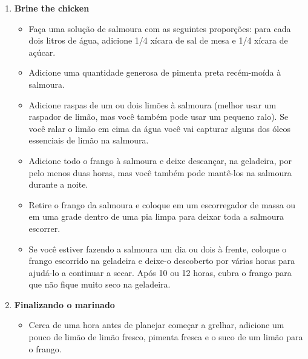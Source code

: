 \documentclass [11pt, letterpaper] {article}
\begin{document}
\begin {description}
\begin {enumerate}
\item {\bf Brine the chicken}
\begin {itemize}
\item Faça uma solução de salmoura com as seguintes proporções: para cada dois litros de água, adicione 1/4 xícara de sal de mesa e 1/4 xícara de açúcar.
\item Adicione uma quantidade generosa de pimenta preta recém-mo\'ida à salmoura.
\item Adicione raspas de um ou dois limões à salmoura (melhor usar um raspador de limão, mas você também pode usar um pequeno ralo). Se você ralar o lim\~ao em cima da água você vai capturar alguns dos óleos essenciais de limão na salmoura.
\item Adicione todo o frango à salmoura e deixe descan\c{c}ar, na geladeira, por pelo menos duas horas, mas você também pode mantê-los na salmoura durante a noite.
\item Retire o frango da salmoura e coloque em um escorregador de massa ou em uma grade dentro de uma pia limpa para deixar toda a salmoura escorrer.
\item Se você estiver fazendo a salmoura um dia ou dois à frente, coloque o frango escorrido na geladeira e deixe-o descoberto por várias horas para ajudá-lo a continuar a secar. Após 10 ou 12 horas, cubra o frango para que não fique muito seco na geladeira.
\end {itemize}
\item {\bf Finalizando o marinado}
\begin {itemize}
\item Cerca de uma hora antes de planejar começar a grelhar, adicione um pouco de limão de limão fresco, pimenta fresca e o suco de um limão para o frango.
\end {itemize}


\end{enumerate}
\end{description}
\end{document}
